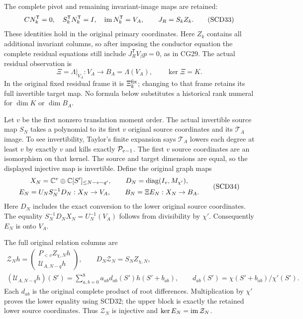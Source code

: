 The complete pivot and remaining invariant-image maps are retained:
\[
 CN_k^{\mathsf T}=0,\quad
 S_k^{\mathsf T}N_k^{\mathsf T}=I,\quad
 \operatorname{im} N_k^{\mathsf T}=V_A,\qquad J_R=S_kZ_k .
 \tag{SCD33}
\]
These identities hold in the original primary coordinates.
Here \(Z_k\) contains all additional invariant columns, so after
imposing the conductor equation the complete residual equations
still include \(J_R^{\mathsf T}V_\beta p=0\), as in CG29.
The actual residual observation is
\[
 \Xi=\Lambda|_{V_A}:V_A\to B_A=\Lambda(V_A),\qquad\ker\Xi=K.
\]
In the original fixed residual frame it is \(\Xi_k^{\rm fix}\);
changing to that frame retains its full invertible target map.
No formula below substitutes a historical rank numeral for
\(\dim K\) or \(\dim B_A\).

Let \(v\) be the first nonzero translation moment order. The actual
invertible source map \(S_N\) takes a polynomial to its first \(v\)
original source coordinates and its \(\mathcal T_A\) image.
To see invertibility, Taylor's finite expansion says
\(\mathcal T_A\) lowers each degree at least \(v\) by exactly \(v\)
and kills exactly \(\mathcal P_{v-1}\). The first \(v\) source coordinates
are an isomorphism on that kernel. The source and target dimensions
are equal, so the displayed injective map is invertible.
Define the original graph maps
\[
 \begin{gathered}
 X_N=\mathbb C^v\oplus\mathbb C[S']_{\le N-v-q'},\qquad
 D_N=\operatorname{diag}(I_v,M_{\chi'}),\\
 E_N=U_NS_N^{-1}D_N:X_N\to V_A,\qquad
 B_N=\Xi E_N:X_N\to B_A .
 \end{gathered}
 \tag{SCD34}
\]
Here \(D_N\) includes the exact conversion to the lower original
source coordinates. The equality
\(S_N^{-1}D_NX_N=U_N^{-1}(V_A)\) follows from divisibility by
\(\chi'\). Consequently \(E_N\) is onto \(V_A\).

The full original relation columns are
\[
 \begin{gathered}
 \mathcal Z_Nh=
 \begin{pmatrix}P_{<v}Z_{\chi,N}h\\\mathcal U_{A,N-q}h\end{pmatrix},
 \qquad D_N\mathcal Z_N=S_NZ_{\chi,N},\\
 (\mathcal U_{A,N-q}h)(S')
 =\sum_{a,b=0}^8a_{ab}d_{ab}(S')h(S'+b_{ab}),\qquad
 d_{ab}(S')=\chi(S'+b_{ab})/\chi'(S').
 \end{gathered}
 \tag{SCD35}
\]
Each \(d_{ab}\) is the original complete product of root differences.
Multiplication by \(\chi'\) proves the lower equality using SCD32;
the upper block is exactly the retained lower source coordinates.
Thus \(\mathcal Z_N\) is injective and
\(\ker E_N=\operatorname{im}\mathcal Z_N\).

